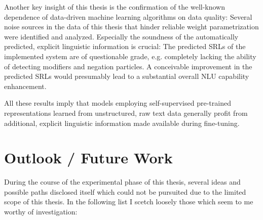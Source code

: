 Another key insight of this thesis is the confirmation of the well-known dependence of data-driven
machine learning algorithms on data quality: Several noise sources in the data of this thesis that
hinder reliable weight parametrization were identified and analyzed. Especially the soundness of
the automatically predicted, explicit linguistic information is crucial: The predicted SRLs of the
implemented system are of questionable grade, e.g. completely lacking the ability of detecting
modifiers and negation particles. A conceivable improvement in the predicted SRLs would presumably
lead to a substantial overall NLU capability enhancement.

All these results imply that models employing self-supervised pre-trained representations learned
from unstructured, raw text data generally profit from additional, explicit linguistic information
made available during fine-tuning.



\section*{Outlook / Future Work}

During the course of the experimental phase of this thesis, several ideas and possible paths
disclosed itself which could not be pursuited due to the limited scope of this thesis. In the
following list I scetch loosely those which seem to me worthy of investigation:

